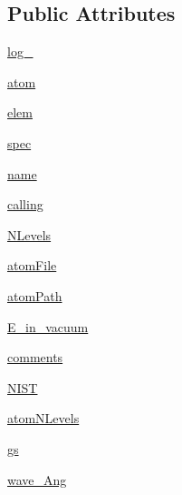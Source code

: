 \subsection*{Public Attributes}
\begin{DoxyCompactItemize}
\item 
\hyperlink{classpyneb_1_1core_1_1pynebcore_1_1___atom_data_ascii_afd87151907f32bc0dc45f0171b61374e}{log\-\_\-}
\item 
\hyperlink{classpyneb_1_1core_1_1pynebcore_1_1___atom_data_ascii_a0c5c7091b1d8a95d9bee2744d713f5c9}{atom}
\item 
\hyperlink{classpyneb_1_1core_1_1pynebcore_1_1___atom_data_ascii_a62e73dc66c7aff7941c5ce94e808c23a}{elem}
\item 
\hyperlink{classpyneb_1_1core_1_1pynebcore_1_1___atom_data_ascii_adaf1b66faf18504ec4b5c8c0b7f6763b}{spec}
\item 
\hyperlink{classpyneb_1_1core_1_1pynebcore_1_1___atom_data_ascii_ab74e6bf80237ddc4109968cedc58c151}{name}
\item 
\hyperlink{classpyneb_1_1core_1_1pynebcore_1_1___atom_data_ascii_ab25fa7ebe84b603684dee62410c1e34c}{calling}
\item 
\hyperlink{classpyneb_1_1core_1_1pynebcore_1_1___atom_data_ascii_a4d45fe163c2108853ab418386bf4da56}{N\-Levels}
\item 
\hyperlink{classpyneb_1_1core_1_1pynebcore_1_1___atom_data_ascii_afa3c4660b3bcf1e2c199413048b9209e}{atom\-File}
\item 
\hyperlink{classpyneb_1_1core_1_1pynebcore_1_1___atom_data_ascii_a18178a28ecf0c7f251d0974c2097b214}{atom\-Path}
\item 
\hyperlink{classpyneb_1_1core_1_1pynebcore_1_1___atom_data_ascii_a9ebe0987aa5ded08c781ed3b5feb4d8a}{E\-\_\-in\-\_\-vacuum}
\item 
\hyperlink{classpyneb_1_1core_1_1pynebcore_1_1___atom_data_ascii_a64b8b36116751d566275b722e40bb3a7}{comments}
\item 
\hyperlink{classpyneb_1_1core_1_1pynebcore_1_1___atom_data_ascii_a6d03226c81aa049b486e97a3462a794b}{N\-I\-S\-T}
\item 
\hyperlink{classpyneb_1_1core_1_1pynebcore_1_1___atom_data_ascii_ae9ca7d9b8e6463826cd148ff606cbc1c}{atom\-N\-Levels}
\item 
\hyperlink{classpyneb_1_1core_1_1pynebcore_1_1___atom_data_ascii_a7cdd347489383ef85cb3526af2a7a0aa}{gs}
\item 
\hyperlink{classpyneb_1_1core_1_1pynebcore_1_1___atom_data_ascii_ab5130f33e76a12670614a4ecf47211b0}{wave\-\_\-\-Ang}
\end{DoxyCompactItemize}


